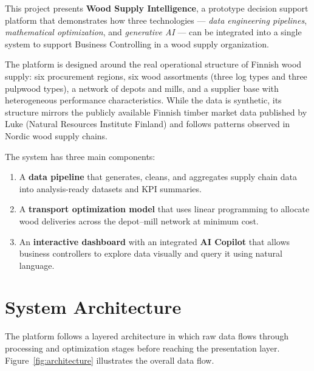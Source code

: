 \documentclass[11pt,a4paper]{article}
\begin{document}
This project presents \textbf{Wood Supply Intelligence}, a prototype decision support platform that demonstrates how three technologies --- \textit{data engineering pipelines}, \textit{mathematical optimization}, and \textit{generative AI} --- can be integrated into a single system to support Business Controlling in a wood supply organization.

The platform is designed around the real operational structure of Finnish wood supply: six procurement regions, six wood assortments (three log types and three pulpwood types), a network of depots and mills, and a supplier base with heterogeneous performance characteristics. While the data is synthetic, its structure mirrors the publicly available Finnish timber market data published by Luke (Natural Resources Institute Finland) and follows patterns observed in Nordic wood supply chains.

The system has three main components:
\begin{enumerate}[leftmargin=2em]
    \item A \textbf{data pipeline} that generates, cleans, and aggregates supply chain data into analysis-ready datasets and KPI summaries.
    \item A \textbf{transport optimization model} that uses linear programming to allocate wood deliveries across the depot--mill network at minimum cost.
    \item An \textbf{interactive dashboard} with an integrated \textbf{AI Copilot} that allows business controllers to explore data visually and query it using natural language.
\end{enumerate}


\section{System Architecture}

The platform follows a layered architecture in which raw data flows through processing and optimization stages before reaching the presentation layer. Figure~\ref{fig:architecture} illustrates the overall data flow.
\end{document}
